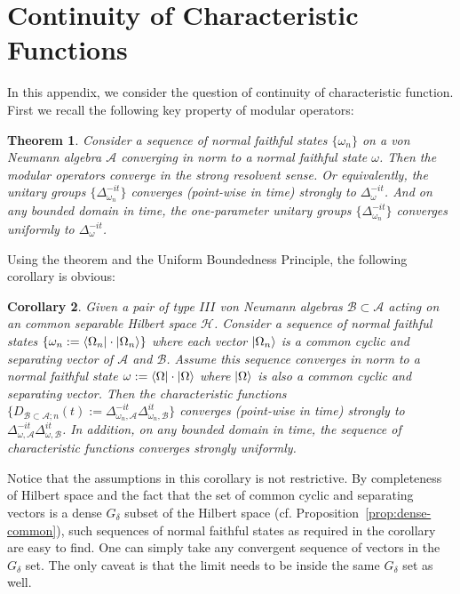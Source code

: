 \documentclass[a4paper,11pt]{article}
\newtheorem{theorem}{Theorem}
\newtheorem{corollary}[theorem]{Corollary}
\theoremstyle{definition}
\begin{document}
\section{Continuity of Characteristic Functions}\label{section:continuity}
In this appendix, we consider the question of continuity of characteristic function. First we recall the following key property of modular operators:
\begin{theorem}\label{theorem:continuityofmodular}
    Consider a sequence of normal faithful states $\{\omega_n\}$ on a von Neumann algebra $\mathcal{A}$ converging in norm to a normal faithful state $\omega$. Then the modular operators converge in the strong resolvent sense. Or equivalently, the unitary groups $\{\Delta_{\omega_n}^{-it}\}$ converges (point-wise in time) strongly to $\Delta_\omega^{-it}$. And on any bounded domain in time, the one-parameter unitary groups $\{\Delta_{\omega_n}^{-it}\}$ converges uniformly to $\Delta_\omega^{-it}$.
\end{theorem}
Using the theorem and the Uniform Boundedness Principle, the following corollary is obvious:
\begin{corollary}\label{corollary:firstcorollary}
    Given a pair of type $III$ von Neumann algebras $\mathcal{B}\subset\mathcal{A}$ acting on an common separable Hilbert space $\mathcal{H}$. Consider a sequence of normal faithful states $\{\omega_n:=\bra{\Omega_n}\cdot\ket{\Omega_n}\}$ where each vector $\ket{\Omega_n}$ is a common cyclic and separating vector of $\mathcal{A}$ and $\mathcal{B}$. Assume this sequence converges in norm to a normal faithful state $\omega:=\bra{\Omega}\cdot\ket{\Omega}$ where $\ket{\Omega}$ is also a common cyclic and separating vector. Then the characteristic functions $\{D_{\mathcal{B}\subset \mathcal{A};n}(t) := \Delta_{\omega_n,\mathcal{A}}^{-it}\Delta_{\omega_n, \mathcal{B}}^{it}\}$ converges (point-wise in time) strongly to $\Delta_{\omega,\mathcal{A}}^{-it}\Delta_{\omega,\mathcal{B}}^{it}$. In addition, on any bounded domain in time, the sequence of characteristic functions converges strongly uniformly.
\end{corollary}
Notice that the assumptions in this corollary is not restrictive. By completeness of Hilbert space and the fact that the set of common cyclic and separating vectors is a dense $G_\delta$ subset of the Hilbert space (cf. Proposition~\ref{prop:dense-common}), such sequences of normal faithful states as required in the corollary are easy to find. One can simply take any convergent sequence of vectors in the $G_\delta$ set. The only caveat is that the limit needs to be inside the same $G_\delta$ set as well. 
\end{document}
